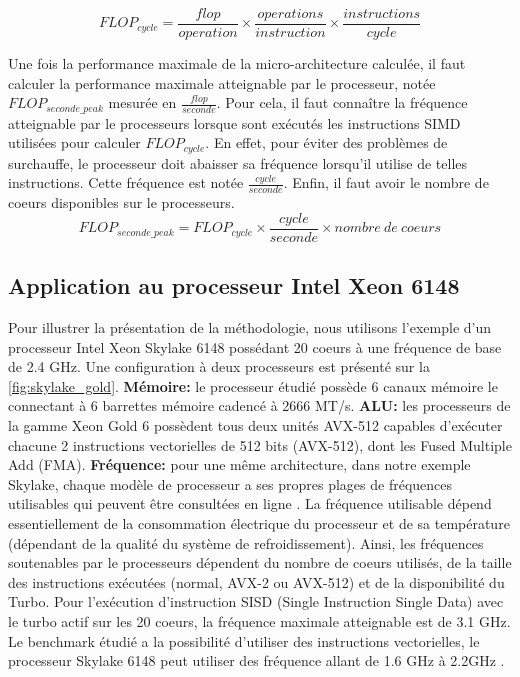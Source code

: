 \begin{equation}
\label{eq:floc}
    FLOP_{cycle} = \frac{flop}{operation} \times \frac{operations}{instruction} \times \frac{instructions}{cycle}
\end{equation}

Une fois la performance maximale de la micro-architecture calculée, il faut calculer la performance maximale atteignable par le processeur, notée $FLOP_{seconde\_peak}$ mesurée en $\frac{flop}{seconde} $. Pour cela, il faut connaître la fréquence atteignable par le processeurs lorsque sont exécutés les instructions SIMD utilisées pour calculer $FLOP_{cycle}$. En effet, pour éviter des problèmes de surchauffe, le processeur doit abaisser sa fréquence lorsqu'il utilise de telles instructions. Cette fréquence est notée $\frac{cycle}{seconde}$. Enfin, il faut avoir le nombre de coeurs disponibles sur le processeurs.
\begin{equation}
\label{eq:flops}
    FLOP_{seconde\_peak} = FLOP_{cycle} \times \frac{cycle}{seconde} \times nombre\ de\ coeurs
\end{equation}





\subsection{Application au processeur Intel Xeon 6148}

Pour illustrer la présentation de la méthodologie, nous utilisons l'exemple d'un processeur Intel Xeon Skylake 6148 possédant 20 coeurs à une fréquence de base de 2.4 GHz. Une configuration à deux processeurs est présenté sur la \autoref{fig:skylake_gold}. \textbf{Mémoire: } le processeur étudié possède 6 canaux mémoire le connectant à 6 barrettes mémoire cadencé à 2666 MT/s. \textbf{ALU:} les processeurs de la gamme Xeon Gold 6 possèdent tous deux unités AVX-512 capables d'exécuter chacune 2 instructions vectorielles de 512 bits (AVX-512), dont les Fused Multiple Add (FMA). \textbf{Fréquence:} pour une même architecture, dans notre exemple Skylake, chaque modèle de processeur a ses propres plages de fréquences utilisables qui peuvent être consultées en ligne \cite{Wikichipa}. La fréquence utilisable dépend essentiellement de la consommation électrique du processeur et de sa température (dépendant de la qualité du système de refroidissement). Ainsi, les fréquences soutenables par le processeurs dépendent du nombre de coeurs utilisés, de la taille des instructions  exécutées (normal, AVX-2 ou AVX-512) et de la disponibilité du Turbo. Pour l'exécution d'instruction SISD (Single Instruction Single Data) avec le turbo actif sur les 20 coeurs, la fréquence maximale atteignable est de 3.1 GHz.  Le benchmark étudié a la possibilité d'utiliser des instructions vectorielles, le processeur Skylake 6148 peut utiliser des fréquence allant de 1.6 GHz à 2.2GHz \cite{Wikichipa}. 

